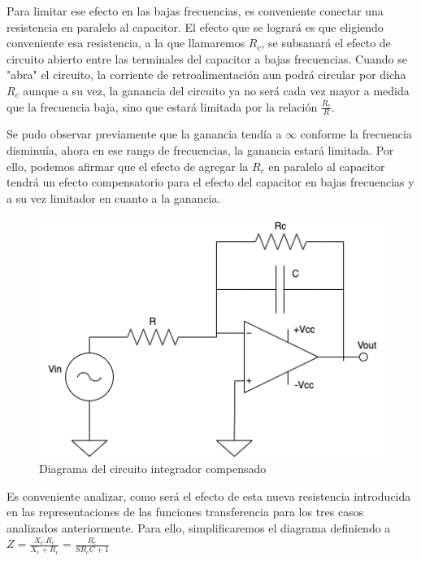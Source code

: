 Para limitar ese efecto en las bajas frecuencias, es conveniente conectar una resistencia en paralelo al capacitor. El efecto que se logrará es que eligiendo conveniente esa resistencia,
a la que llamaremos $R_c$, se subsanará el efecto de circuito abierto entre las  terminales del capacitor a bajas frecuencias. Cuando se "abra" el circuito, la corriente de retroalimentación
aun podrá circular por dicha $R_c$ aunque a su vez, la ganancia del circuito ya no será cada vez mayor a medida que la frecuencia baja, sino que estará limitada por la relación 
$\frac{R_c}{R}$. 

Se pudo observar previamente que la ganancia tendía a $\infty$ conforme la frecuencia disminuía, ahora en ese rango de frecuencias, la ganancia estará limitada. Por ello, podemos
afirmar que el efecto de agregar la $R_c$ en paralelo al capacitor tendrá un efecto compensatorio para el efecto del capacitor en bajas frecuencias y a su vez limitador en cuanto a la 
ganancia. 

\begin{figure}[H]
    \centering 
    \includegraphics [scale=0.7] {../Ejercicio3-CircuitoIntegradoresyDerivadores/Imagenes/diagrama-integrador-compensado.png} 
    \caption{Diagrama del circuito integrador compensado}
    \label{fig:emptyPlotTool}
\end{figure}

Es conveniente analizar, como será el efecto de esta nueva resistencia introducida en las representaciones de las funciones transferencia para los tres
casos analizados anteriormente. Para ello, simplificaremos el diagrama definiendo a $Z=\frac{X_c.R_c}{X_c+R_c}=\frac{R_c}{SR_cC+1}$

